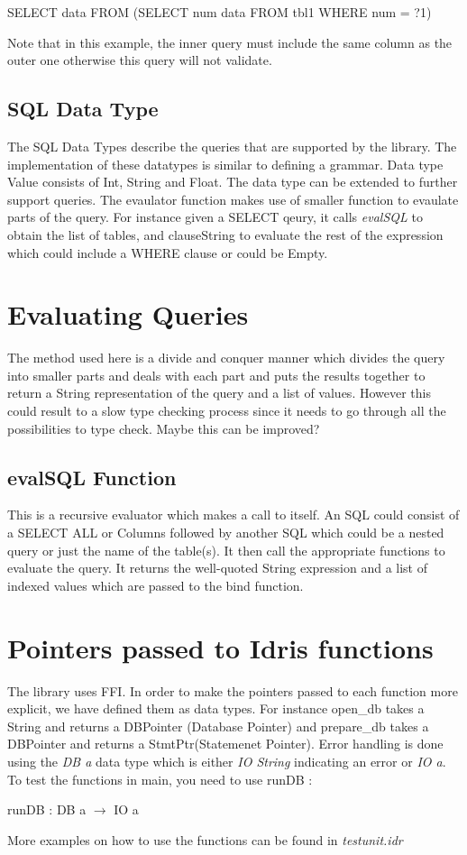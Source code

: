 \documentclass[11pt]{article}
\begin{document}
SELECT data FROM (SELECT num data FROM tbl1 WHERE num = ?1)

Note that in this example, the inner query must include the same column as the outer one otherwise this query will not validate.

\subsection{SQL Data Type}
\label{SQL Data Type}
The SQL Data Types describe the queries that are supported by the library.
The implementation of these datatypes is similar to defining a grammar.
Data type Value consists of Int, String and Float.
The data type can be extended to further support queries.
The evaulator function makes use of smaller function to evaulate parts of the query.
For instance given a SELECT qeury, it calls \emph{evalSQL} to obtain the list of tables,
and clauseString to evaluate the rest of the expression which could include a WHERE clause or could be Empty.


\section{Evaluating Queries}
\label{Evaluating Queries}
The method used here is a divide and conquer manner which divides the query into smaller
parts and deals with each part and puts the results together to return a String representation
of the query and a list of values.
However this could result to a slow type checking process since it needs to go through all
the possibilities to type check. Maybe this can be improved?

\subsection{evalSQL Function}
\label{evalSQL Function}
This is a recursive evaluator which makes a call to itself.
An SQL could consist of a SELECT ALL or Columns followed by another SQL
which could be a nested query or just the name of the table(s).
It then call the appropriate functions to evaluate the query.
It returns the well-quoted String expression and a list of indexed values which are passed to the bind function.
\section{Pointers passed to Idris functions}
\label{Pointers passed to Idris functions}

The library uses FFI. In order to make the pointers passed to each function more explicit,
we have defined them as data types. For instance open\_db takes a String and returns a DBPointer
(Database Pointer) and prepare\_db
takes a DBPointer and returns a StmtPtr(Statemenet Pointer).
Error handling is done using the \emph {DB a} data type which
is either \emph {IO String} indicating an error or \emph{ IO a}.
To test the functions in main, you need to use runDB :
\begin{center}
\centering                                           runDB : DB a $\rightarrow$ IO a
\end{center}
More examples on how to use the functions can be found in \emph{testunit.idr}
\end{document}

